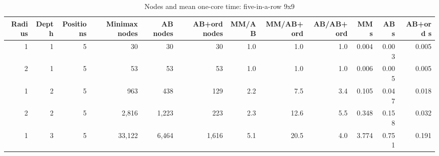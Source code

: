\begin{table}[!t]
\centering
\caption{Nodes and mean one-core time: five-in-a-row 9x9}
\label{tab:nodes_gomoku9}
\small
\begin{tabular}{rrrrrrrrrrrr}
\toprule
Radius & Depth & Positions & Minimax nodes & AB nodes & AB+ord nodes & MM/AB & MM/AB+ord & AB/AB+ord & MM s & AB s & AB+ord s \\
\midrule
1 & 1 & 5 & 30 & 30 & 30 & 1.0 & 1.0 & 1.0 & 0.004 & 0.003 & 0.005 \\
2 & 1 & 5 & 53 & 53 & 53 & 1.0 & 1.0 & 1.0 & 0.006 & 0.005 & 0.005 \\
1 & 2 & 5 & 963 & 438 & 129 & 2.2 & 7.5 & 3.4 & 0.105 & 0.047 & 0.018 \\
2 & 2 & 5 & 2,816 & 1,223 & 223 & 2.3 & 12.6 & 5.5 & 0.348 & 0.158 & 0.032 \\
1 & 3 & 5 & 33,122 & 6,464 & 1,616 & 5.1 & 20.5 & 4.0 & 3.774 & 0.751 & 0.191 \\
\bottomrule
\end{tabular}
\end{table}
